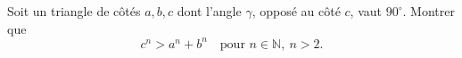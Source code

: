 Soit un triangle de côtés $a, b, c$ dont l'angle $\gamma$, opposé au côté $c$, vaut $90^\circ$. Montrer que
\[ c^n > a^n + b^n \quad\text{pour } n \in \mathbb{N},\ n > 2. \]
